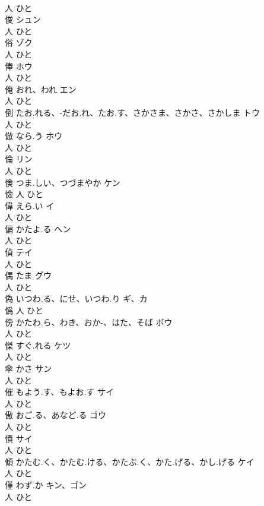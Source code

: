 \documentclass[8pt]{extreport}
\begin{document}
\begin{CJK}{UTF8}{min}
\\	人		ひと		
\\	俊		シュン	
\\	人		ひと		
\\	俗		ゾク	
\\	人		ひと		
\\	俸		ホウ	
\\	人		ひと		
\\	俺	おれ、われ	エン	
\\	人		ひと		
\\	倒	たお.れる、-だお.れ、たお.す、さかさま、さかさ、さかしま	トウ	
\\	人		ひと		
\\	倣	なら.う	ホウ	
\\	人		ひと		
\\	倫		リン	
\\	人		ひと		
\\	倹	つま.しい、つづまやか	ケン	
\\	儉	人		ひと		
\\	偉	えら.い	イ	
\\	人		ひと		
\\	偏	かたよ.る	ヘン	
\\	人		ひと		
\\	偵		テイ	
\\	人		ひと		
\\	偶	たま	グウ	
\\	人		ひと		
\\	偽	いつわ.る、にせ、いつわ.り	ギ、カ	
\\	僞	人		ひと		
\\	傍	かたわ.ら、わき、おか-、はた、そば	ボウ	
\\	人		ひと		
\\	傑	すぐ.れる	ケツ	
\\	人		ひと		
\\	傘	かさ	サン	
\\	人		ひと		
\\	催	もよう.す、もよお.す	サイ	
\\	人		ひと		
\\	傲	おご.る、あなど.る	ゴウ	
\\	人		ひと		
\\	債		サイ	
\\	人		ひと		
\\	傾	かたむ.く、かたむ.ける、かたぶ.く、かた.げる、かし.げる	ケイ	
\\	人		ひと		
\\	僅	わず.か	キン、ゴン	
\\	人		ひと		

\end{CJK}
\end{document}
